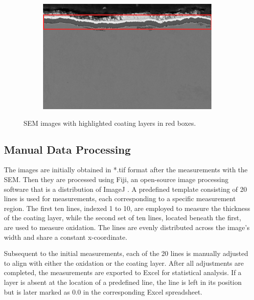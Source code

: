 \begin{figure}[ht]
\begin{subfigure}{0.3\textwidth}
        \label{fig:subfig2}
    \end{subfigure}
    \hfill
    \begin{subfigure}{0.3\textwidth}
        \centering
        \includegraphics[width=\linewidth]{PICTURES/original_data/208.png}
        \label{fig:subfig3}
    \end{subfigure}
    \caption{SEM images with highlighted coating layers in red boxes.}
    \label{fig:three-images}
\end{figure}

\subsection{Manual Data Processing}\label{sec:ManualProc}

The images are initially obtained in *.tif format after the measurements with the SEM. Then they are processed using Fiji, an open-source image processing software that is a distribution of ImageJ \cite{Schindelin2012}. A predefined template consisting of 20 lines is used for measurements, each corresponding to a specific measurement region. The first ten lines, indexed 1 to 10, are employed to measure the thickness of the coating layer, while the second set of ten lines, located beneath the first, are used to measure oxidation. The lines are evenly distributed across the image's width and share a constant x-coordinate.

Subsequent to the initial measurements, each of the 20 lines is manually adjusted to align with either the oxidation or the coating layer. After all adjustments are completed, the measurements are exported to Excel for statistical analysis. If a layer is absent at the location of a predefined line, the line is left in its position but is later marked as 0.0 in the corresponding Excel spreadsheet. 

